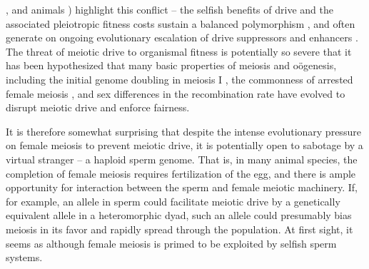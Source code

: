 \documentclass[12pt,letterpaper]{article}
\begin{document}
\citep{Buckler1999,Fishman2005,Fishman2008}, and animals
\citep{Agulnik1990,Wu2005,Pardo-ManuelDeVillena2001c}) highlight this
conflict -- the selfish benefits of drive and the associated
pleiotropic fitness costs sustain a balanced polymorphism
\citep{Prout1973}, 
and often generate on ongoing evolutionary escalation of drive suppressors and enhancers \citep{Dawe1996,Fishman2008}. 
The threat of meiotic drive to organismal fitness is potentially so
severe that it has been hypothesized that many basic properties of meiosis and o\"{o}genesis, including the initial genome doubling in meiosis I \citep{Haig1991}, the commonness of arrested female meiosis \citep{Mira1998}, and sex differences in the recombination rate \citep{Haig2010,Brandvain2012} have evolved to disrupt meiotic drive and enforce fairness.

It is therefore somewhat surprising that despite the intense evolutionary pressure on female meiosis to prevent meiotic drive, 
it is potentially open to sabotage by a virtual stranger -- a haploid sperm genome.
That is, in many animal species, the completion of female meiosis requires fertilization of the egg, 
and there is ample opportunity for interaction between the sperm and female meiotic machinery.
If, for example, an allele in sperm could facilitate meiotic drive by a genetically equivalent allele in a 
heteromorphic dyad, such an allele could presumably bias meiosis in its favor and rapidly spread through the population.
At first sight, it seems as although female meiosis is primed to be exploited by selfish sperm systems.  

\end{document}
